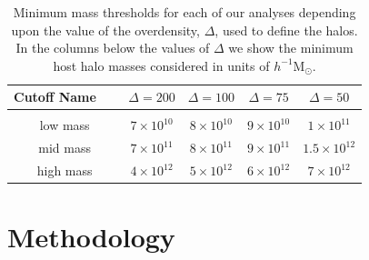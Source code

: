 \documentclass[usenatbib,usegraphicx,letterpaper]{mn2e}
\begin{document}
\begin{table}
\caption{
Minimum mass thresholds for each of our analyses depending upon the 
value of the overdensity, $\Delta$, used to define the halos. 
In the columns below the values of $\Delta$ we show the minimum 
host halo masses considered in units of $h^{-1}\mathrm{M}_{\odot}$.
}
\vspace*{8pt}
\begin{tabular}{ c c c c c }
\hline
\hline
Cutoff Name \ \  & $\Delta=200$ & $\Delta=100$ & $\Delta=75$ & $\Delta=50$ \\
\hline
\\{low mass} & $7 \times 10^{10}$ & $8 \times 10^{10}$ & $9 \times 10^{10}$ & $1 \times 10^{11}$  \\
{mid mass} & $7 \times 10^{11}$ & $8 \times 10^{11}$ & $9 \times 10^{11}$ & $1.5 \times 10^{12}$ \\
{high mass} & $4 \times 10^{12}$ & $5 \times 10^{12}$ & $6 \times 10^{12}$ & $7 \times 10^{12}$ \\
\hline
\hline
\end{tabular}
\label{table:thresholds}
\end{table}


\section[]{Methodology}
\label{section:methodology}
\end{document}
